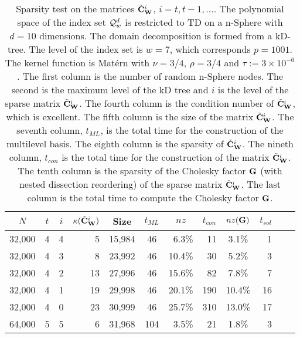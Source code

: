 \documentclass[11pt,final]{amsart}       %
\begin{document}
\setlength{\tabcolsep}{7pt}
\begin{table*}[htpb]
  \caption{Sparsity test on the matrices $\tilde{\mathbf{C}}^{i}_{\mathbf{W}}$, $i =
    t, t-1, \dots$.  The polynomial space of the index set ${\mathcal Q}^d_w$
    is restricted to TD on a n-Sphere with $d = 10$ dimensions. The
    domain decomposition is formed from a kD-tree. The level of the
    index set is $w = 7$, which corresponds $p = 1001$. The kernel
    function is Mat\'{e}rn with $\nu = 3/4$, $\rho = 3/4$ and $\tau :=
    3 \times 10^{-6}$. The first column is the number of random
    n-Sphere nodes. The second is the maximum level of the kD tree and
    $i$ is the level of the sparse matrix $\tilde{\mathbf{C}}^{i}_{\mathbf{W}}$. The
    fourth column is the condition number of $\tilde{\mathbf{C}}^{i}_{\mathbf{W}}$,
    which is excellent.  The fifth column is the size of the matrix
    $\tilde{\mathbf{C}}^{i}_{\mathbf{W}}$.  The seventh column, $t_{ML}$, is the
    total time for the construction of the multilevel basis. The
    eighth column is the sparsity of $\tilde{\mathbf{C}}^{i}_{\mathbf{W}}$.  The
    nineth column, $t_{con}$ is the total time for the construction of
    the matrix $\tilde{\mathbf{C}}^{i}_{\mathbf{W}}$. The tenth column is the
    sparsity of the Cholesky factor $\mathbf{G}$ (with nested dissection
    reordering) of the sparse matrix $\tilde{\mathbf{C}}^{i}_{\mathbf{W}}$. The last
    column is the total time to compute the Cholesky factor $\mathbf{G}$.}
\begin{center}
\begin{tabular}{ r r r r c c r r c r c r}
\multicolumn{1}{c}{$N$} &
\multicolumn{1}{c}{$t$} &
\multicolumn{1}{c}{$i$} &
\multicolumn{1}{c}{$\kappa(\tilde {\mathbf{C}}_{\mathbf{W}}^{i})$} &
\multicolumn{1}{c}{Size} &
\multicolumn{1}{c}{$t_{ML}$} &
\multicolumn{1}{c}{$nz$} &
\multicolumn{1}{c}{$t_{con}$} &
\multicolumn{1}{c}{$nz(\mathbf{G})$} &
\multicolumn{1}{c}{$t_{sol}$}
 \\ 
 \hline
32,000 & 4 & 4 &   5  & 15,984 &  46 &  6.3\% &   11 &  3.1\% &  1 \\
32,000 & 4 & 3 &   8  & 23,992 &  46 & 10.4\% &   30 &  5.2\% &  3 \\
32,000 & 4 & 2 &  13  & 27,996 &  46 & 15.6\% &   82 &  7.8\% &  7 \\
32,000 & 4 & 1 &  19  & 29,998 &  46 & 20.1\% &  190 & 10.4\% & 16 \\
32,000 & 4 & 0 &  23  & 30,999 &  46 & 25.7\% &  310 & 13.0\% & 17 \\
\hline
64,000 & 5 & 5 &   6  & 31,968 & 104 &  3.5\% &   21 & 1.8\%  &  3 \\

\end{tabular}
\end{center}
\end{table*}
\end{document}
